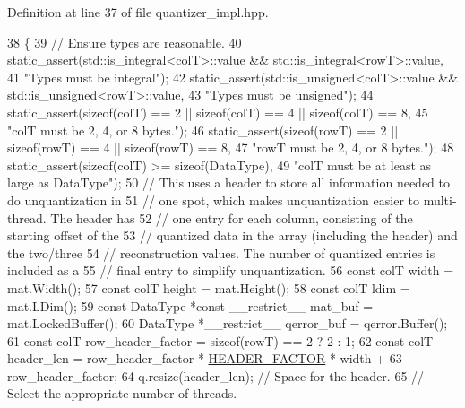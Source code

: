 Definition at line 37 of file quantizer\+\_\+impl.\+hpp.


\begin{DoxyCode}
38                                                                    \{
39   \textcolor{comment}{// Ensure types are reasonable.}
40   static\_assert(std::is\_integral<colT>::value && std::is\_integral<rowT>::value,
41                 \textcolor{stringliteral}{"Types must be integral"});
42   static\_assert(std::is\_unsigned<colT>::value && std::is\_unsigned<rowT>::value,
43                 \textcolor{stringliteral}{"Types must be unsigned"});
44   static\_assert(\textcolor{keyword}{sizeof}(colT) == 2 || \textcolor{keyword}{sizeof}(colT) == 4 || \textcolor{keyword}{sizeof}(colT) == 8,
45                 \textcolor{stringliteral}{"colT must be 2, 4, or 8 bytes."});
46   static\_assert(\textcolor{keyword}{sizeof}(rowT) == 2 || \textcolor{keyword}{sizeof}(rowT) == 4 || \textcolor{keyword}{sizeof}(rowT) == 8,
47                 \textcolor{stringliteral}{"rowT must be 2, 4, or 8 bytes."});
48   static\_assert(\textcolor{keyword}{sizeof}(colT) >= \textcolor{keyword}{sizeof}(DataType),
49                 \textcolor{stringliteral}{"colT must be at least as large as DataType"});
50   \textcolor{comment}{// This uses a header to store all information needed to do unquantization in}
51   \textcolor{comment}{// one spot, which makes unquantization easier to multi-thread. The header has}
52   \textcolor{comment}{// one entry for each column, consisting of the starting offset of the}
53   \textcolor{comment}{// quantized data in the array (including the header) and the two/three}
54   \textcolor{comment}{// reconstruction values. The number of quantized entries is included as a}
55   \textcolor{comment}{// final entry to simplify unquantization.}
56   \textcolor{keyword}{const} colT width = mat.Width();
57   \textcolor{keyword}{const} colT height = mat.Height();
58   \textcolor{keyword}{const} colT ldim = mat.LDim();
59   \textcolor{keyword}{const} DataType *\textcolor{keyword}{const} \_\_restrict\_\_ mat\_buf = mat.LockedBuffer();
60   DataType *\_\_restrict\_\_ qerror\_buf = qerror.Buffer();
61   \textcolor{keyword}{const} colT row\_header\_factor = \textcolor{keyword}{sizeof}(rowT) == 2 ? 2 : 1;
62   \textcolor{keyword}{const} colT header\_len = row\_header\_factor * \hyperlink{classlbann_1_1lbann__quantizer_afb4315625e371169cabfac56c3f75d37}{HEADER\_FACTOR} * width +
63                           row\_header\_factor;
64   q.resize(header\_len);  \textcolor{comment}{// Space for the header.}
65   \textcolor{comment}{// Select the appropriate number of threads.}

\end{DoxyCode}
